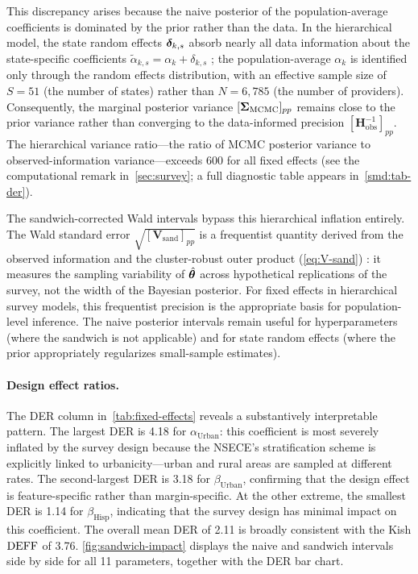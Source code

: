 This discrepancy arises because the naive posterior of the population-average
coefficients is dominated by the prior rather than the data. In the
hierarchical model, the state random effects $\boldsymbol{\delta}_{k,s}$ absorb nearly
all data information about the state-specific coefficients
$\tilde{\alpha}_{k,s} = \alpha_k + \delta_{k,s}$
\citep[cf.][]{RabeHeskethSkrondal2006}; the population-average
$\alpha_k$ is identified only through the random effects distribution, with
an effective sample size of $S = 51$ (the number of states) rather than
$N = 6{,}785$ (the number of providers). Consequently, the marginal
posterior variance $[\boldsymbol{\Sigma}_{\mathrm{MCMC}}]_{pp}$ remains close to the
prior variance rather than converging to the data-informed precision
$[\mathbf{H}_{\mathrm{obs}}^{-1}]_{pp}$. The hierarchical variance
ratio---the ratio of MCMC posterior variance to observed-information
variance---exceeds 600 for all fixed effects (see the computational remark
in~\cref{sec:survey}; a full diagnostic table appears in~\cref{smd:tab-der}).

The sandwich-corrected Wald intervals bypass this hierarchical inflation entirely.
The Wald standard error $\sqrt{[\mathbf{V}_{\mathrm{sand}}]_{pp}}$ is a
frequentist quantity derived from the observed information and the
cluster-robust outer product (\cref{eq:V-sand})
\citep{Binder1983, WilliamsSavitsky2021}: it measures the sampling
variability of $\hat{\boldsymbol{\theta}}$ across hypothetical replications of the
survey, not the width of the Bayesian posterior. For fixed effects in
hierarchical survey models, this frequentist precision is the appropriate
basis for population-level inference. The naive posterior intervals remain
useful for hyperparameters (where the sandwich is not applicable) and for
state random effects (where the prior appropriately regularizes small-sample
estimates).

\paragraph{Design effect ratios.}
The DER column in~\cref{tab:fixed-effects} reveals a substantively
interpretable pattern. The largest DER is 4.18 for
$\alpha_{\mathrm{Urban}}$: this coefficient is most severely inflated by
the survey design because the NSECE's stratification scheme
\citep{NSECEProjectTeam2022} is explicitly
linked to urbanicity---urban and rural areas are sampled at different rates.
The second-largest DER is 3.18 for $\beta_{\mathrm{Urban}}$, confirming
that the design effect is feature-specific rather than margin-specific. At
the other extreme, the smallest DER is 1.14 for $\beta_{\mathrm{Hisp}}$,
indicating that the survey design has minimal impact on this coefficient.
The overall mean DER of 2.11 is broadly consistent with the Kish $\text{DEFF}$
of 3.76. \cref{fig:sandwich-impact} displays the naive and sandwich
intervals side by side for all 11 parameters, together with the DER
bar chart.

